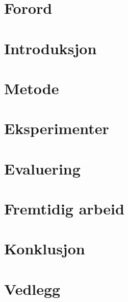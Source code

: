 \documentclass[12pt,twoside,norsk,onecolumn]{article}
\begin{document}
\newcommand{\bht}{Bård Henning Tvedt }
\newcommand{\bhtmb}{Bård Henning Tvedt og Marc Bezem }
\newcommand{\ilog}{ILOG Scheduler }

\tableofcontents
\newpage

\section*{Forord}
%
\newpage

\begin{center}
\printnomenclature[2.5 cm]
\end{center}
\newpage

\section{Introduksjon}





\section{Metode}


\section{Eksperimenter}


\section{Evaluering}


\section{Fremtidig arbeid}

\section{Konklusjon}
\newpage

\section{Vedlegg}

\newpage




\end{document}
